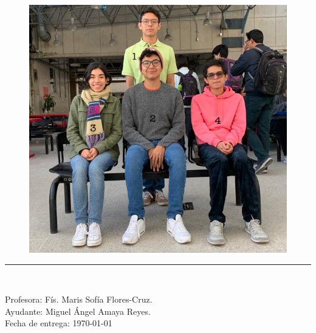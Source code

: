 \documentclass[letterpaper, 11 pt]{article}
\begin{document}
\begin{center}
\paragraph{}
\begin{figure}[H]
    \captionsetup{justification=centering,margin=2cm}
    \includegraphics[scale=0.23]{uwu.jpg}
    \centering
\end{figure}
\rule{80mm}{0.1mm}\\
\begin{large}
Profesora:  Fís. Maris Sofía Flores-Cruz.  \\
Ayudante: Miguel Ángel Amaya Reyes. \\
Fecha de entrega: \today\\
\end{large}
\end{center}

\newpage

\end{document}
